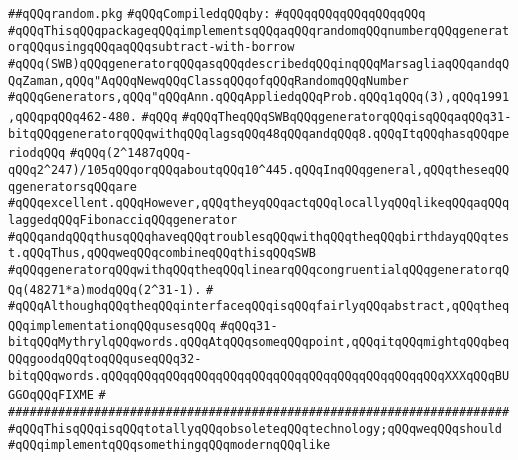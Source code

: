 \label{src/lib/src/random.pkg}
\verb|##qQQqrandom.pkg|\newline
\newline
\verb|#qQQqCompiledqQQqby:|\newline
\verb|#qQQqqQQqqQQqqQQqqQQq|\newline
\newline
\verb|#qQQqThisqQQqpackageqQQqimplementsqQQqaqQQqrandomqQQqnumberqQQqgeneratorqQQqusingqQQqaqQQqsubtract-with-borrow|\newline
\verb|#qQQq(SWB)qQQqgeneratorqQQqasqQQqdescribedqQQqinqQQqMarsagliaqQQqandqQQqZaman,qQQq"AqQQqNewqQQqClassqQQqofqQQqRandomqQQqNumber|\newline
\verb|#qQQqGenerators,qQQq"qQQqAnn.qQQqAppliedqQQqProb.qQQq1qQQq(3),qQQq1991,qQQqpqQQq462-480.|\newline
\verb|#qQQq|\newline
\verb|#qQQqTheqQQqSWBqQQqgeneratorqQQqisqQQqaqQQq31-bitqQQqgeneratorqQQqwithqQQqlagsqQQq48qQQqandqQQq8.qQQqItqQQqhasqQQqperiodqQQq|\newline
\verb|#qQQq(2^1487qQQq-qQQq2^247)/105qQQqorqQQqaboutqQQq10^445.qQQqInqQQqgeneral,qQQqtheseqQQqgeneratorsqQQqare|\newline
\verb|#qQQqexcellent.qQQqHowever,qQQqtheyqQQqactqQQqlocallyqQQqlikeqQQqaqQQqlaggedqQQqFibonacciqQQqgenerator|\newline
\verb|#qQQqandqQQqthusqQQqhaveqQQqtroublesqQQqwithqQQqtheqQQqbirthdayqQQqtest.qQQqThus,qQQqweqQQqcombineqQQqthisqQQqSWB|\newline
\verb|#qQQqgeneratorqQQqwithqQQqtheqQQqlinearqQQqcongruentialqQQqgeneratorqQQq(48271*a)modqQQq(2^31-1).|\newline
\verb|#|\newline
\verb|#qQQqAlthoughqQQqtheqQQqinterfaceqQQqisqQQqfairlyqQQqabstract,qQQqtheqQQqimplementationqQQqusesqQQq|\newline
\verb|#qQQq31-bitqQQqMythrylqQQqwords.qQQqAtqQQqsomeqQQqpoint,qQQqitqQQqmightqQQqbeqQQqgoodqQQqtoqQQquseqQQq32-bitqQQqwords.qQQqqQQqqQQqqQQqqQQqqQQqqQQqqQQqqQQqqQQqqQQqqQQqXXXqQQqBUGGOqQQqFIXME|\newline
\verb|#|\newline
\verb|######################################################################|\newline
\verb|#qQQqThisqQQqisqQQqtotallyqQQqobsoleteqQQqtechnology;qQQqweqQQqshould|\newline
\verb|#qQQqimplementqQQqsomethingqQQqmodernqQQqlike|\newline

